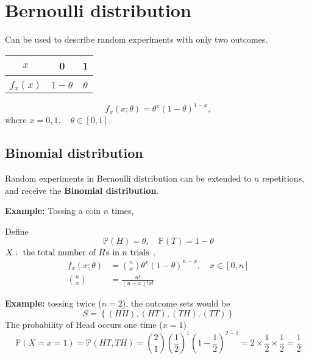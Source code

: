 \documentclass[12pt]{article}
\title{}
\author{}
\date{}
\begin{document}
\section{Bernoulli distribution}
Can be used to describe random experiments with only two outcomes.

\begin{table}[h!]
\begin{center}
\begin{threeparttable}

\begin{tabular}{c|c|c}
$ x $ & 0 & 1 \\
\hline \\[-1.8ex]
$ f_{x}(x) $& $ 1 - \theta $ & $ \theta $
\end{tabular}
\end{threeparttable}
\end{center}
\end{table}


\begin{equation*}
f_{x}(x;\theta) = \theta^{x}(1 - \theta)^{1 - x}, 
\end{equation*}
where $ x = 0,1, \quad \theta \in [0,1] $.





\subsection{Binomial distribution}
Random experiments in Bernoulli distribution can be extended to $ n $ repetitions,
and receive the {\textbf {Binomial distribution}}.

{\textbf {Example:}}
Tossing a coin $ n $ times,

Define
\begin{equation*}
\mathbb{P}(H) = \theta, \quad \mathbb{P}(T) = 1 - \theta
\end{equation*}
$ X: \text{ the total number of $ H $s in $ n $ trials } $.
\begin{align*}
f_{x}(x;\theta)&= \binom{n}{x}\theta^{x}(1 - \theta)^{n - x}, \quad x \in [0,n]\\
\binom{n}{x}&= \frac{n!}{(n - x)!x!}
\end{align*}

{\textbf {Example:}}
tossing twice ($ n = 2 $), the outcome sets would be 
\begin{equation*}
S = \left\{ (HH),(HT),(TH),(TT) \right\} 
\end{equation*}
The probability of Head occurs one time ($ x = 1 $)
\begin{equation*}
\mathbb{P}(X = x = 1) = \mathbb{P}(HT,TH) = \binom{2}{1}(\frac{1}{2})^{1}
(1 - \frac{1}{2})^{2 - 1} = 2  \times \frac{1}{2} \times \frac{1}{2} = \frac{1}{2}
\end{equation*}
\end{document}
